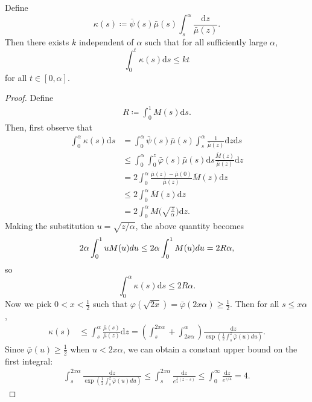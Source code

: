 \documentclass[10pt,a4paper]{amsart}
\begin{document}
    \begin{lem}
    Define
    \[\kappa(s) \coloneqq \bar\psi(s)\bar\mu(s)\int_s^{\alpha}\frac{\mathrm{d}z}{\bar\mu(z)}.\]
    Then there exists $k$ independent of $\alpha$ such that for all sufficiently large $\alpha$,
    \[\int_0^t\kappa(s)\mathrm{d}s \leq kt\]
    for all $t\in[0,\alpha]$.
\end{lem}

\begin{proof}
    Define
    \begin{align*}
        R\coloneqq \int_0^1M(s)\mathrm{d}s.
    \end{align*}
    Then, first observe that
    \begin{align*}
        \int_0^\alpha \kappa(s)\mathrm{d}s &= \int_0^\alpha \bar\psi(s)\bar\mu(s)\int_s^\alpha\frac{1}{\bar\mu(z)}\mathrm{d}z\mathrm{d}s \\
        &\leq \int_{0}^\alpha\int_{0}^z\bar\varphi(s)\bar\mu(s)\mathrm{d}s\frac{\overline M(z)}{\bar\mu(z)}\mathrm{d}z \\
        &=2\int_0^\alpha\frac{\bar\mu(z)-\bar\mu(0)}{\bar\mu(z)}\overline M(z)\mathrm{d}z\\
        &\leq 2\int_0^\alpha \overline M(z)\mathrm{d}z \\
        &= 2\int_0^\alpha M\biggl(\sqrt{\frac z\alpha}\biggr)\mathrm{d}z.
    \end{align*}
    Making the substitution $u = \sqrt{z/\alpha}$, the above quantity becomes
    \begin{align*}
        2\alpha\int_0^1uM(u)\textrm du\leq 2\alpha\int_0^1 M(u)\textrm{d}u = 2R\alpha,
    \end{align*}
    so
    \[\int_0^\alpha\kappa(s)\mathrm{d}s \leq 2R\alpha.\]
    Now we pick $0<x<\frac12$ such that $\varphi(\sqrt{2x})=\bar\varphi(2x\alpha)\geq \frac 12$. Then for all $s\leq x\alpha$,
    \begin{align*}
        \kappa(s) &\leq \int_s^{\alpha}\frac{\bar\mu(s)}{\bar\mu(z)}\mathrm{d}z =\left(\int_s^{2x\alpha}+\int_{2x\alpha}^\alpha\right) \frac{\mathrm{d}z}{\exp\left(\frac 12\int_s^z \bar\varphi(u)du\right)}.
    \end{align*}
    Since $\bar\varphi(u)\geq \frac 12$ when $u<2x\alpha$, we can obtain a constant upper bound on the first integral:
    \begin{align*}
        \int_s^{2x\alpha}\frac{\mathrm{d}z}{\exp\left(\frac 12\int_s^z \bar\varphi(u)du\right)} \leq \int_s^{2x\alpha}\frac{\mathrm{d}z}{e^{\frac 14(z-s)}} \leq \int_0^{\infty}\frac{\mathrm{d}z}{e^{z/4}} = 4.

\end{align*}
\end{proof}
\end{document}
